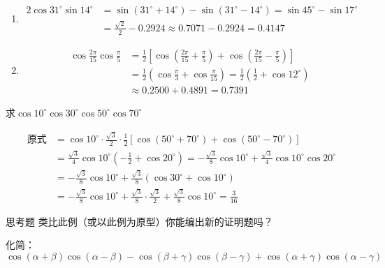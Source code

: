\begin{solution}
\begin{enumerate}[(1)]
    \item \[\begin{split}
        2\cos 31^{\circ}\sin14^{\circ}&=\sin(31^{\circ}+14^{\circ})-\sin(31^{\circ}-14^{\circ})=\sin 45^{\circ}-\sin17^{\circ}\\
&=\frac{\sqrt{2}}{2}-0.2924\approx 0.7071-0.2924=0.4147
    \end{split}\]
    \item \[\begin{split}
        \cos\frac{2\pi}{15}\cos\frac{\pi}{5}&=\frac{1}{2}\left[\cos\left(\frac{2\pi}{15}+\frac{\pi}{5}\right)+\cos\left(\frac{2\pi}{15}-\frac{\pi}{5}\right)\right]\\
        &=\frac{1}{2}\left(\cos\frac{\pi}{3}+\cos\frac{\pi}{15}\right)=\frac{1}{2}\left(\frac{1}{2}+\cos12^{\circ}\right)\\
        &\approx 0.2500+0.4891=0.7391
    \end{split}\] 
\end{enumerate}
\end{solution}

\begin{example}
    求$\cos10^{\circ}\cos30^{\circ}\cos50^{\circ}\cos70^{\circ}$
\end{example}

\begin{solution}
\[\begin{split}
    \text{原式}&= \cos10^{\circ}\cdot \frac{\sqrt{3}}{2}\cdot \frac{1}{2}[\cos(50^{\circ}+70^{\circ})+\cos(50^{\circ}-70^{\circ})]\\
    &=\frac{\sqrt{3}}{4}\cos10^{\circ}\left(-\frac{1}{2}+\cos20^{\circ}\right)=-\frac{\sqrt{3}}{8}\cos10^{\circ}+\frac{\sqrt{3}}{4}\cos10^{\circ}\cos20^{\circ}\\
    &=-\frac{\sqrt{3}}{8}\cos10^{\circ}+\frac{\sqrt{3}}{8}(\cos30^{\circ}+\cos10^{\circ})\\
    &=-\frac{\sqrt{3}}{8}\cos10^{\circ}+\frac{\sqrt{3}}{8}\cdot \frac{\sqrt{3}}{2}+\frac{\sqrt{3}}{8}\cos 10^{\circ}=\frac{3}{16}
\end{split}\]
\end{solution}

\begin{thm}{思考题}
类比此例（或以此例为原型）你能编出新的证明题吗？
\end{thm}

\begin{example}
    化简：$\cos(\alpha+\beta)\cos(\alpha-\beta)-\cos(\beta+\gamma)\cos(\beta-\gamma)+\cos(\alpha+\gamma)\cos(\alpha-\gamma)$
\end{example}

